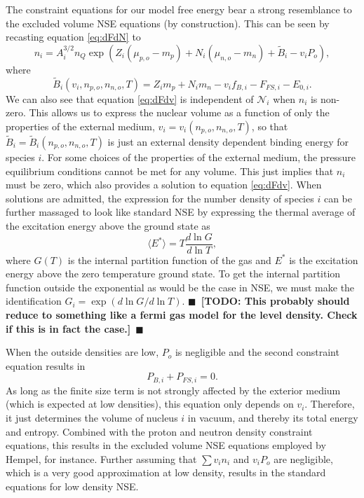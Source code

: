 \documentclass[11pt,letter]{article}
\newcommand{\todo}[1]{{$\blacksquare$~\textbf{\color{blue}[TODO: #1]}}~$\blacksquare$}
\begin{document}
The constraint equations for our model free energy bear a strong resemblance 
to the excluded volume NSE equations (by construction).  This can be seen by recasting 
equation \ref{eq:dFdN} to 
\begin{equation}
n_i = A_i^{3/2} n_Q \exp(Z_i (\mu_{p,o} - m_p) + N_i (\mu_{n,o} - m_n) + \tilde B_i - v_i P_o),
\end{equation}
where 
\begin{equation}
\tilde B_i(v_i, n_{p,o}, n_{n,o}, T) = 
 Z_i m_p + N_i m_n - v_i f_{B,i} - F_{FS,i} - E_{0,i}.
\end{equation}
We can also see that equation \ref{eq:dFdv} is independent of $\mathcal{N}_i$ 
when $n_i$ is non-zero.  This allows us to express the nuclear volume as a 
function of only the properties of the external medium, $v_i = v_i(n_{p,o},
n_{n,o}, T)$, so that $\tilde B_i = \tilde B_i(n_{p,o}, n_{n,o}, T)$ is just 
an external density dependent binding energy for species $i$.  For some choices 
of the properties of the external medium, the pressure equilibrium conditions 
cannot be met for any volume.  This just implies that $n_i$ must be zero, which 
also provides a solution to equation \ref{eq:dFdv}.  When solutions are admitted, 
the expression for the number density of species $i$ can be further massaged to look like standard NSE by expressing the thermal average 
of the excitation energy above the ground state as 
\begin{equation}
\langle E^* \rangle = T \frac{d \ln G}{d \ln T},
\end{equation} 
where $G(T)$ is the internal partition function of the gas and $E^*$ is the 
excitation energy above the zero temperature ground state.  To get the 
internal partition function outside the exponential as would be the case in 
NSE, we must make the identification $ G_i = \exp(d \ln G/ d\ln T)$.  
\todo{This probably should reduce to something like a fermi gas model for the 
level density.  Check if this is in fact the case.}

When the outside densities are low, $P_o$ is negligible and the second
constraint equation results in \begin{equation}
P_{B,i} + P_{FS,i} = 0.
\end{equation} 
As long as the finite size term is not strongly affected by the exterior medium
(which is expected at low densities), this equation only depends on $v_i$.
Therefore, it just determines the volume of nucleus $i$ in vacuum, and thereby
its total energy and entropy.  Combined with the proton and neutron density 
constraint equations, this results in the excluded volume NSE equations employed 
by Hempel, for instance.  Further assuming that $\sum v_i n_i$ and $v_i P_o$ are 
negligible, which is a very good approximation at low density, results in the
standard equations for low density NSE.
\end{document}
